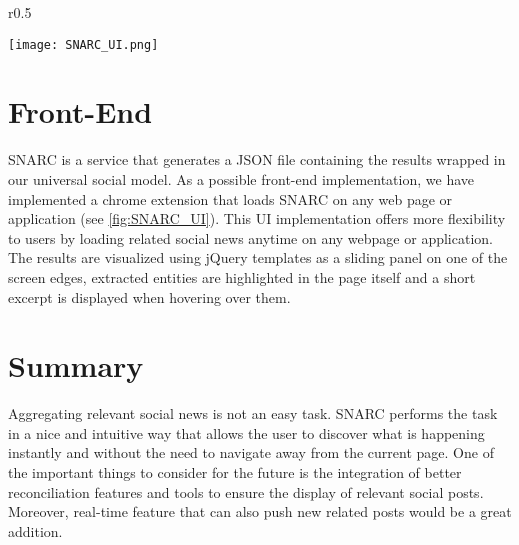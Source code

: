 
\begin{wrapfigure}{r}{0.5\textwidth}
  \begin{center}
    \texttt{[image: SNARC\_UI.png]}
  \end{center}
  \caption{SNARC's User Interface - The Google Chrome Extension}
  \label{fig:SNARC_UI}
\end{wrapfigure}

\section{Front-End}
SNARC is a service that generates a JSON file containing the results wrapped in our universal social model. As a possible front-end implementation, we have implemented a chrome extension that loads SNARC on any web page or application (see \ref{fig:SNARC_UI}). This UI implementation offers more flexibility to users by loading related social news anytime on any webpage or application. The results are visualized using jQuery templates as a sliding panel on one of the screen edges, extracted entities are highlighted in the page itself and a short excerpt is displayed when hovering over them.


\section{Summary}

Aggregating relevant social news is not an easy task. SNARC performs the task in a nice and intuitive way that allows the user to discover what is happening instantly and without the need to navigate away from the current page. One of the important things to consider for the future is the integration of better reconciliation features and tools to ensure the display of relevant social posts. Moreover, real-time feature that can also push new related posts would be a great addition.
